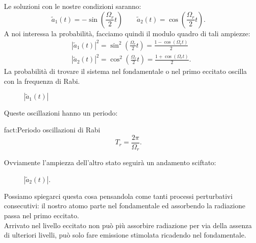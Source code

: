 Le soluzioni con le nostre condizioni saranno:
\[
    \tilde{a}_1(t) = -\sin\left(\frac{\Omega_r}{2}t\right) \qquad
    \tilde{a}_2(t) = \cos\left(\frac{\Omega_r}{2}t\right)
.\] 
A noi interessa la probabilità, facciamo quindi il modulo quadro di tali ampiezze:
\[\begin{aligned}
    &\left|\tilde{a}_1(t)\right|^2 = \sin^2\left(\frac{\Omega_r}{2}t\right)=
    \frac{1-\cos\left(\Omega_r t\right)}{2}\\
    &\left|\tilde{a}_2(t)\right|^2 = \cos^2\left(\frac{\Omega_r}{2}t\right)=
    \frac{1+\cos\left(\Omega_rt\right)}{2}
.\end{aligned}\]
La probabilità di trovare il sistema nel fondamentale o nel primo eccitato oscilla con la frequenza di Rabi. 
\begin{figure}[H]
    \centering
    \caption{$\left|\tilde{a}_1(t) \right|$ }
    \label{ddd}
\end{figure}
Queste oscillazioni hanno un periodo:
\begin{fact}{fact:Periodo oscillazioni di Rabi}
\[
    T_r = \frac{2\pi}{\Omega_r}
.\] 
\end{fact}
Ovviamente l'ampiezza dell'altro stato seguirà un andamento sciftato:
\begin{figure}[H]
    \centering
    \caption{$\left|\tilde{a}_2(t) \right|$.}
    \label{1111}
\end{figure}
\noindent
Possiamo spiegarci questa cosa pensandola come tanti processi perturbativi consecutivi: il nostro atomo parte nel fondamentale ed assorbendo la radiazione passa nel primo eccitato. \\
Arrivato nel livello eccitato non può più assorbire radiazione per via della assenza di ulteriori livelli, può solo fare emissione stimolata ricadendo nel fondamentale.\\
